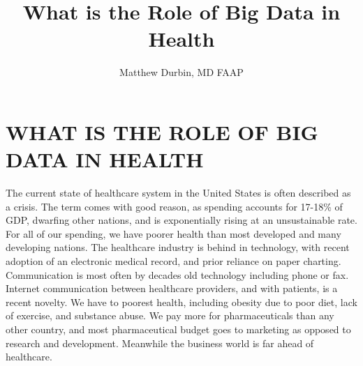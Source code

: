 \documentclass[sigconf]{acmart}
\begin{document}
\title{What is the Role of Big Data in Health}


\author{Matthew Durbin, MD FAAP}

\renewcommand{\shortauthors}{M. Durbin}





\begin{abstract}
\end{abstract}

\maketitle





\section{WHAT IS THE ROLE OF BIG DATA IN HEALTH}

The current state of healthcare system in the United States is often
described as a crisis.  The term comes with good reason, as spending
accounts for 17-18\% of GDP, dwarfing other nations, and is
exponentially rising at an unsustainable rate.  For all of our
spending, we have poorer health than most developed and many
developing nations.  The healthcare industry is behind in technology,
with recent adoption of an electronic medical record, and prior
reliance on paper charting.  Communication is most often by decades
old technology including phone or fax.  Internet communication between
healthcare providers, and with patients, is a recent novelty.  We have
to poorest health, including obesity due to poor diet, lack of
exercise, and substance abuse.  We pay more for pharmaceuticals than
any other country, and most pharmaceutical budget goes to marketing as
opposed to research and development.  Meanwhile the business world is
far ahead of healthcare.
\end{document}
